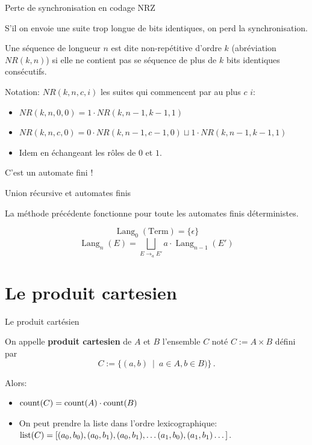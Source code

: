 \documentclass{beamer}
\begin{document}
\begin{frame}{Perte de synchronisation en codage NRZ}

  S'il on envoie une suite trop longue de bits identiques, on perd la
  synchronisation.
  \medskip

  \begin{definition}
    Une séquence de longueur $n$ est dite non-repétitive d'ordre $k$
    (abréviation $NR(k, n)$) si elle ne contient pas se séquence de plus de
    $k$ bits identiques consécutifs.
  \end{definition}
  Notation: $NR(k, n, c, i)$ les suites qui commencent par au plus $c$ $i$:
  \begin{itemize}
  \item $NR(k, n, 0, 0) = 1 \cdot NR(k, n-1, k-1, 1)$
  \item $NR(k, n, c, 0) = 0 \cdot NR(k, n-1, c-1, 0) \sqcup 
               1 \cdot NR(k, n-1, k-1, 1)$
             \item Idem en échangeant les rôles de $0$ et $1$.
  \end{itemize}
  \pause
  \LARGE C'est un automate fini !
\end{frame}

\begin{frame}{Union récursive et automates finis}

  \begin{NOTE}
    La méthode précédente fonctionne pour toute les automates finis
    déterministes.
  \end{NOTE}
  \[
  \operatorname{Lang}_0(\text{Term}) = \{\epsilon\}
  \]
  \[
  \operatorname{Lang}_n(E) = 
  \bigsqcup_{E\rightarrow_a E'} a\cdot \operatorname{Lang}_{n-1}(E')
  \]
\end{frame}

\section{Le produit cartesien}
\begin{frame}{Le produit cartésien}

  \begin{definition}
    On appelle \textbf{produit cartesien} de $A$ et $B$ l'ensemble $C$ noté 
    $C:=A\times B$ défini par
    $$C := \{(a,b)\ \mid\ a\in A, b\in B)\}\,.$$
  \end{definition}
  \pause\bigskip

  Alors:
  \begin{itemize}
  \item $\operatorname{count}(C) = \operatorname{count}(A)\cdot\operatorname{count}(B)$
  \item On peut prendre la liste dans l'ordre lexicographique:
    $\operatorname{list}(C) = 
    [(a_0, b_0), (a_0, b_1), (a_0, b_1),\dots  (a_1, b_0), (a_1, b_1)\dots]$.
  \end{itemize}
\end{frame}
\end{document}
